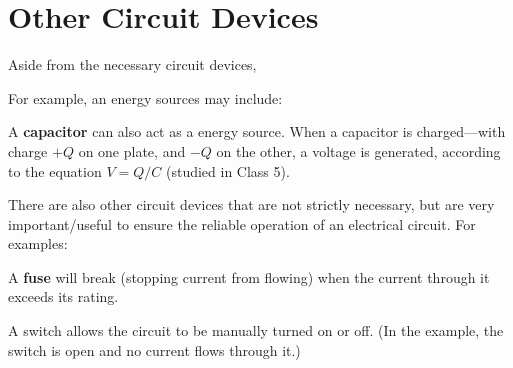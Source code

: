 \section{Other Circuit Devices}

Aside from the necessary circuit devices,

For example, an energy sources may include:

A \textbf{capacitor} can also act as a energy source. When a capacitor is
charged---with charge $+Q$ on one plate, and $-Q$ on the other, a voltage is
generated, according to the equation $V=Q/C$ (studied in Class 5).

There are also other circuit devices that are not strictly necessary, but are
very important/useful to ensure the reliable operation of an electrical
circuit. For examples:

\begin{figure}[ht]
  \centering
\end{figure}
A \textbf{fuse} will break (stopping current from flowing) when the current
through it exceeds its rating.

\begin{figure}[ht]
  \centering
\end{figure}
A switch allows the circuit to be manually turned on or off. (In the example,
the switch is open and no current flows through it.)
%  
%
%
%
